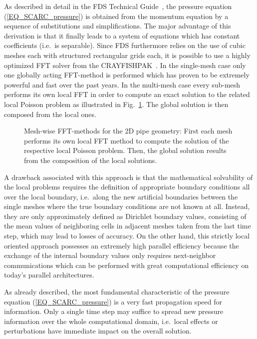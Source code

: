 As described in detail in the FDS Technical Guide~\cite{McGrattan:2018:TG}, the pressure equation (\ref{EQ_SCARC_pressure}) is obtained from the momentum equation by a sequence of substitutions and simplifications. The major advantage of this derivation is that it finally leads to a system of equations which has constant coefficients (i.e.\ is separable). 
Since FDS furthermore relies on the use of cubic meshes each with structured rectangular grids each, it is possible to use a highly optimized FFT solver from the CRAYFISHPAK~\cite{Sweet::Crayfishpak}.
%
In the single-mesh case only one globally acting FFT-method is performed which has proven to be extremely powerful and fast over the past years. 
In the multi-mesh case every sub-mesh performs its own local FFT in order to compute an exact solution to the related local Poisson problem as illustrated in Fig.~\ref{FIG_SCARC_local_ffts}. The global solution is then composed from the local ones.
\begin{figure}[ht]
\begin{center}

\caption[Mesh-wise FFT-methods]{Mesh-wise FFT-methods for the 2D pipe geometry: First each mesh performs its own local FFT method to compute the solution of the respective local Poisson problem. Then, the global solution results from the composition of the local solutions.}
\label{FIG_SCARC_local_ffts}
\end{center}
\end{figure}

A drawback associated with this approach is that the mathematical solvability of the local problems requires the definition of appropriate boundary conditions all over the local boundary, i.e.\ along the new artificial boundaries between the single meshes where the true boundary conditions are not known at all. Instead, they are only approximately defined as Dirichlet boundary values, consisting of the mean values of neighboring cells in adjacent meshes taken from the last time step, which may lead to losses of accuracy.
%
On the other hand, this strictly local oriented approach possesses an extremely high parallel efficiency because the exchange of the internal boundary values only requires next-neighbor communications which can be performed with great computational efficiency on today's parallel architectures.

As already described, the most fundamental characteristic of the pressure equation (\ref{EQ_SCARC_pressure})  is a very fast propagation speed for information. Only a single time step may suffice to spread new pressure information over the whole computational domain, i.e.\ local effects or perturbations have immediate impact on the overall solution. 


